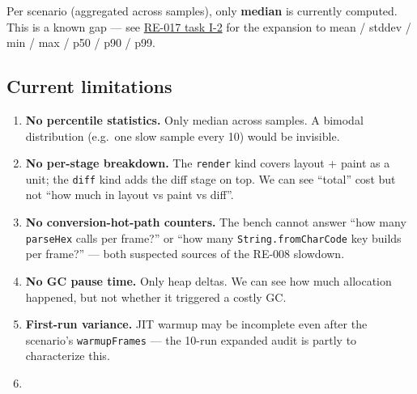 

Per scenario (aggregated across samples), only \textbf{median} is currently computed. This is a known gap --- see \href{https://github.com/flyingrobots/bijou/blob/cbd70612140e7a450d764b3c7be1c6af878b99bc/docs/design}{RE-017 task I-2} for the expansion to mean / stddev / min / max / p50 / p90 / p99.

\subsection{Current limitations}\label{record-422-current-limitations}

\begin{enumerate}
\def\labelenumi{\arabic{enumi}.}
\tightlist
\item
  \textbf{No percentile statistics.} Only median across samples. A bimodal distribution (e.g.~one slow sample every 10) would be invisible.
\item
  \textbf{No per-stage breakdown.} The \texttt{r\allowbreak{}e\allowbreak{}n\allowbreak{}d\allowbreak{}e\allowbreak{}r} kind covers layout + paint as a unit; the \texttt{d\allowbreak{}i\allowbreak{}f\allowbreak{}f} kind adds the diff stage on top. We can see ``total'' cost but not ``how much in layout vs paint vs diff''.
\item
  \textbf{No conversion-hot-path counters.} The bench cannot answer ``how many \texttt{p\allowbreak{}a\allowbreak{}r\allowbreak{}s\allowbreak{}e\allowbreak{}H\allowbreak{}e\allowbreak{}x} calls per frame?'' or ``how many \texttt{S\allowbreak{}t\allowbreak{}r\allowbreak{}i\allowbreak{}n\allowbreak{}g\allowbreak{}.\allowbreak{}f\allowbreak{}r\allowbreak{}o\allowbreak{}m\allowbreak{}C\allowbreak{}h\allowbreak{}a\allowbreak{}r\allowbreak{}C\allowbreak{}o\allowbreak{}d\allowbreak{}e} key builds per frame?'' --- both suspected sources of the RE-008 slowdown.
\item
  \textbf{No GC pause time.} Only heap deltas. We can see how much allocation happened, but not whether it triggered a costly GC.
\item
  \textbf{First-run variance.} JIT warmup may be incomplete even after the scenario's \texttt{w\allowbreak{}a\allowbreak{}r\allowbreak{}m\allowbreak{}u\allowbreak{}p\allowbreak{}F\allowbreak{}r\allowbreak{}a\allowbreak{}m\allowbreak{}e\allowbreak{}s} --- the 10-run expanded audit is partly to characterize this.
\item

\end{enumerate}
